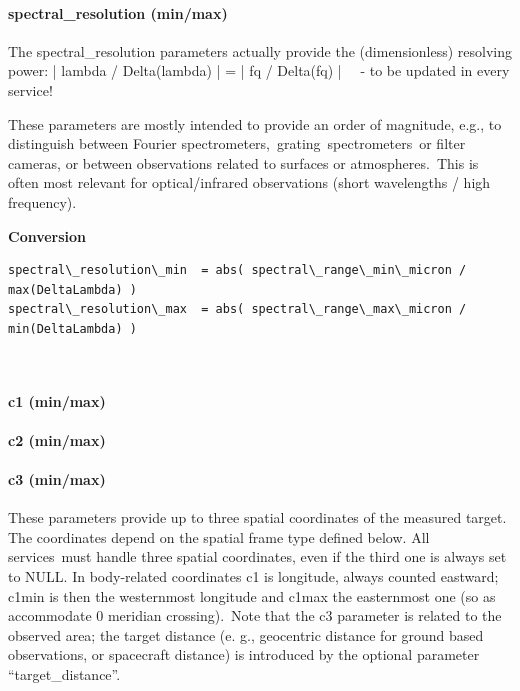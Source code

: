 \documentclass[11pt,a4paper]{ivoa}
\begin{document}
\paragraph{spectral\_resolution (min/max)}

The spectral\_resolution parameters actually provide the (dimensionless) resolving power: | lambda / Delta(lambda) | = | fq / Delta(fq) |   - to be updated in every service!

These parameters are mostly intended to provide an order of magnitude, e.g., to distinguish between Fourier spectrometers, grating spectrometers or filter cameras, or between observations related to surfaces or atmospheres. This is often most relevant for optical/infrared observations (short wavelengths / high frequency).





\textbf{Conversion}




\begin{verbatim}spectral\_resolution\_min  = abs( spectral\_range\_min\_micron / max(DeltaLambda) )
spectral\_resolution\_max  = abs( spectral\_range\_max\_micron / min(DeltaLambda) )\end{verbatim}




\\

\paragraph{c1 (min/max)}

\paragraph{c2 (min/max)}

\paragraph{c3 (min/max)}

These parameters provide up to three spatial coordinates of the measured target. The coordinates depend on the spatial frame type defined below. All services must handle three spatial coordinates, even if the third one is always set to NULL. In body-related coordinates c1 is longitude, always counted eastward; c1min is then the westernmost longitude and c1max the easternmost one (so as accommodate 0 meridian crossing). Note that the c3 parameter is related to the observed area; the target distance (e. g., geocentric distance for ground based observations, or spacecraft distance) is introduced by the optional parameter ``target\_distance''.
\end{document}
